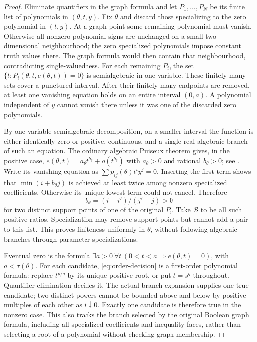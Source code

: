 \begin{proof}
Eliminate quantifiers in the graph formula and let $P_1,\ldots,P_N$
be its finite list of polynomials in $(\theta,t,y)$. Fix $\theta$ and
discard those specializing to the zero polynomial in $(t,y)$. At a graph
point some remaining polynomial must vanish. Otherwise all nonzero
polynomial signs are unchanged on a small two-dimensional neighbourhood;
the zero specialized polynomials impose constant truth values there.
The graph formula would then contain that neighbourhood, contradicting
single-valuedness. For each remaining $P_i$, the set
$\{t:P_i(\theta,t,e(\theta,t))=0\}$ is semialgebraic in one variable.
These finitely many sets cover a punctured interval. After their finitely
many endpoints are removed, at least one vanishing equation holds on an
entire interval $(0,a)$. A polynomial independent of $y$ cannot vanish
there unless it was one of the discarded zero polynomials.

By one-variable semialgebraic decomposition, on a smaller interval the
function is either identically zero or positive, continuous, and a single
real algebraic branch of such an equation. The ordinary algebraic
Puiseux theorem gives, in the positive case,
$e(\theta,t)=a_\theta t^{b_\theta}+o(t^{b_\theta})$ with
$a_\theta>0$ and rational $b_\theta>0$; see \cite{BCR98,BPR06}.
Write its vanishing equation as
$\sum p_{ij}(\theta)t^i y^j=0$. Inserting the first term shows that
$\min(i+b_\theta j)$ is achieved at least twice among nonzero
specialized coefficients. Otherwise its unique lowest term could not
cancel. Therefore
\[
 b_\theta=(i-i')/(j'-j)>0
\]
for two distinct support points of one of the original $P_i$.
Take $\mathcal B$ to be all such positive ratios. Specialization may
remove support points but cannot add a pair to this list. This proves
finiteness uniformly in $\theta$, without following algebraic branches
through parameter specializations.

Eventual zero is the formula
$\exists a>0\ \forall t\,(0<t<a\Rightarrow e(\theta,t)=0)$, with
$a<\tau(\theta)$. For each candidate, \eqref{eq:order-decision} is a
first-order polynomial formula: replace $t^{p/q}$ by its unique positive
root, or put $t=s^q$ throughout. Quantifier elimination decides it.
The actual branch expansion supplies one true candidate; two distinct
powers cannot be bounded above and below by positive multiples of each
other as $t\downarrow0$. Exactly one candidate is therefore true in
the nonzero case. This also tracks the branch selected by the original
Boolean graph formula, including all specialized coefficients and
inequality faces, rather than selecting a root of a polynomial without
checking graph membership.
\end{proof}

